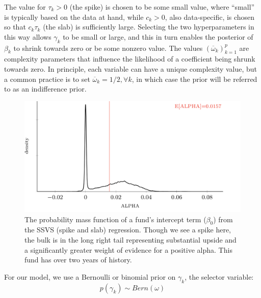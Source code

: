 \documentclass[11pt]{article}
\begin{document}
 The value for $\tau_k > 0$ (the spike) is chosen to be some small value, where ``small'' is typically based on the data at hand, while $c_k > 0$, also data-specific, is chosen so that $c_k \tau_k$ (the slab) is sufficiently large. Selecting the two hyperparameters in this way allows $\gamma_k$ to be small or large, and this in turn enables the posterior of $\beta_k$ to shrink towards zero or be some nonzero value. The values $(\overline{\omega}_k)_{k=1}^p$ are complexity parameters that influence the likelihood of a coefficient being shrunk towards zero. In principle, each variable can have a unique complexity value, but a common practice is to set $\overline{\omega}_k = 1/2, \forall k$, in which case the prior will be referred to as an indifference prior. \\

\begin{figure}[!h]
	\centering
	\includegraphics[width=400pt]{clinton_alpha_2_hl_sfvi.png}
	\parbox{400pt}{\caption{The probability mass function of a fund's intercept term ($\beta_0$) from the SSVS (spike and slab) regression. Though we see a spike here, the bulk is in the long right tail representing substantial upside and a significantly greater weight of evidence for a positive alpha. This fund has over two years of history.}}
\end{figure}

For our model, we use a Bernoulli or binomial prior on $\gamma_k$, the selector variable:
\begin{equation}
\label{eq:gamma_k_dist}
	p\left(\gamma_{k}\right) \sim Bern\left(\omega\right)
\end{equation}
\end{document}
